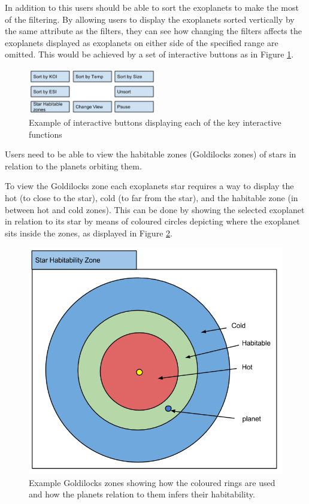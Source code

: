 \begin{enumerate}
In addition to this users should be able to sort the exoplanets to make
the most of the filtering. By allowing users to display the exoplanets sorted
vertically by the same attribute as the filters, they can see how
changing the filters affects the exoplanets displayed as exoplanets on either
side of the specified range are omitted. This would be achieved by a set of
interactive buttons as in Figure \ref{fig:mockButtons}.

\begin{figure}[H]
  \centering
      \includegraphics[width=0.5\textwidth]{images/mockButtons.png}
  \caption[Example of interactive buttons]{Example of interactive buttons
displaying each of the key interactive functions}  
  \label{fig:mockButtons}
\end{figure}

\clearpage
{\bf
 \item[R5.] Users need to be able to view the habitable zones (Goldilocks zones)
of stars in
relation to the planets orbiting them.
}

To view the Goldilocks zone each exoplanets star requires a way to display
the hot (to close to the star), cold (to far from the star), and the habitable
zone (in between hot and cold zones). This can be done by showing
the selected exoplanet in relation to its star by means of coloured circles
depicting where the exoplanet sits inside the zones, as displayed in Figure
\ref{fig:hab}. 

\begin{figure}[H]
  \centering
      \includegraphics[width=.5\textwidth]{images/mockStarHabitability.png}
  \caption[Example of Goldilocks zones]{Example Goldilocks zones showing how the
coloured rings are used and how the planets relation to them infers their
habitability.}  
  \label{fig:hab}
\end{figure}

\end{enumerate}
\clearpage
